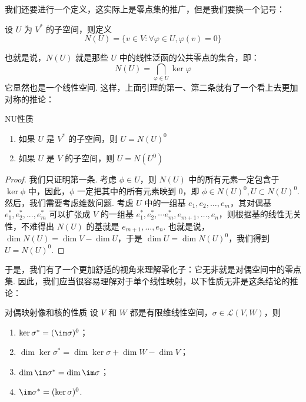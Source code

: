 我们还要进行一个定义，这实际上是零点集的推广，但是我们要换一个记号：

\begin{definition}{}{}
    设 $U$ 为 $V^*$ 的子空间，则定义
    \[
        N(U) = \{v \in V: \forall \varphi \in U, \varphi(v) = 0\}
    \]
\end{definition}

也就是说，$N(U)$ 就是那些 $U$ 中的线性泛函的公共零点的集合，即：
\[
    N(U) = \bigcap_{\varphi \in U} \ker \varphi
\]
它显然也是一个线性空间. 这样，上面引理的第一、第二条就有了一个看上去更加对称的推论：

\begin{lemma}{}{NU性质}
    \begin{enumerate}
        \item 如果 $U$ 是 $V^*$ 的子空间，则 $U = N(U)^0$
        \item 如果 $U$ 是 $V$ 的子空间，则 $U = N(U^0)$
    \end{enumerate}
\end{lemma}

\begin{proof}
    我们只证明第一条. 考虑 $\phi \in U$，则 $N(U)$ 中的所有元素一定包含于 $\ker \phi$ 中，因此，$\phi$ 一定把其中的所有元素映到 $0$，即 $\phi \in N(U)^0, U \subset N(U)^0$. 然后，我们需要考虑维数问题. 考虑 $U$ 中的一组基 $e_1, e_2,\ldots, e_m$，其对偶基 $e_1^*, e_2^*, ..., e_m^*$ 可以扩张成 $V$ 的一组基 $e_1^*, e_2^*, \cdots e_m^*, e_{m + 1},\ldots, e_n$，则根据基的线性无关性，不难得出 $N(U)$ 的基就是 $e_{m + 1},\ldots, e_n$. 也就是说，$\dim N(U) = \dim V - \dim U$，于是 $\dim U = \dim N(U)^0$，我们得到 $U = N(U)^0$.
\end{proof}

于是，我们有了一个更加舒适的视角来理解零化子：它无非就是对偶空间中的零点集. 因此，我们应当很容易理解对于单个线性映射，以下性质无非是这条结论的推论：

\begin{theorem}{}{对偶映射像和核的性质}
    设 $V$ 和 $W$ 都是有限维线性空间，$\sigma\in\mathcal{L}(V,W)$，则
    \begin{enumerate}
        \item $\ker\sigma^*=(\im\sigma)^0$；
        \item $\dim\ker\sigma^*=\dim\ker\sigma+\dim W-\dim V$；
        \item $\dim\im\sigma^*=\dim\im\sigma$；
        \item $\im\sigma^*=(\ker\sigma)^0$.
    \end{enumerate}
\end{theorem}

